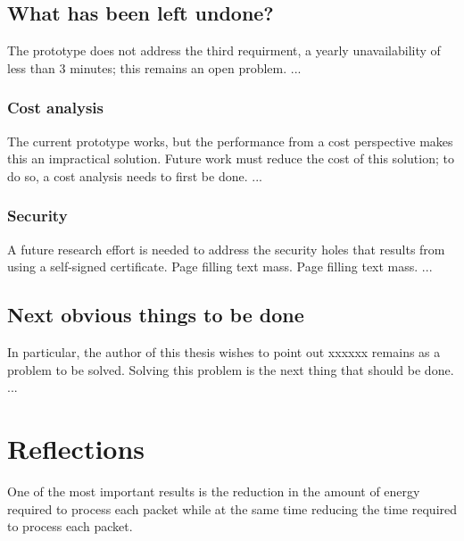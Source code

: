 \subsection{What has been left undone?}
\label{what-has-been-left-undone}


The prototype does not address the third requirment, \ie a yearly unavailability of less than 3 minutes; this remains an open problem. ...


\subsubsection{Cost analysis}




The current prototype works, but the performance from a cost perspective makes this an impractical solution. Future work must reduce the cost of this solution; to do so, a cost analysis needs to first be done. ...


\subsubsection{Security}




A future research effort is needed to address the security holes that results from using a self-signed certificate. Page filling text mass. Page filling text mass. ...


\subsection{Next obvious things to be done}


In particular, the author of this thesis wishes to point out xxxxxx remains as a problem to be solved. Solving this problem is the next thing that should be done. ...


\section{Reflections}
\label{sec:reflections}






One of the most important results is the reduction in the amount of
energy required to process each packet while at the same time reducing the
time required to process each packet.


